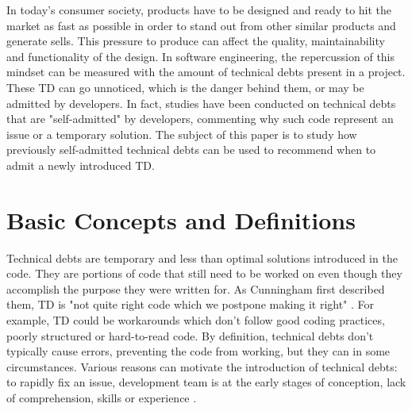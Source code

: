 

\label{sec:Introduction}  


\setlength{\parindent}{5ex} In today's consumer society, products have to be designed and ready to hit the market as fast as possible in order to stand out from other similar products and generate sells. This pressure to produce can affect the quality, maintainability and functionality of the design. In software engineering, the repercussion of this mindset can be measured with the amount of technical debts present in a project. These \ac{TD} can go unnoticed, which is the danger behind them, or may be admitted by developers. In fact, studies have been conducted on technical debts that are "self-admitted" by developers, commenting why such code represent an issue or a temporary solution. The subject of this paper is to study how previously self-admitted technical debts can be used to recommend when to admit a newly introduced \ac{TD}.

\section{Basic Concepts and Definitions}  


\setlength{\parindent}{5ex} Technical debts are temporary and less than optimal solutions introduced in the code. They are portions of code that still need to be worked on even though they accomplish the purpose they were written for. As Cunningham first described them, \ac{TD} is "not quite right code which we postpone making it right" \citep{Cunningham:1992:WPM:157709.157715}. For example, \ac{TD} could be workarounds which don't follow good coding practices, poorly structured or hard-to-read code. By definition, technical debts don't typically cause errors, preventing the code from working, but they can in some circumstances. Various reasons can motivate the introduction of technical debts: to rapidly fix an issue, development team is at the early stages of conception, lack of comprehension, skills or experience \citep{Suryanarayana20151}. \par

